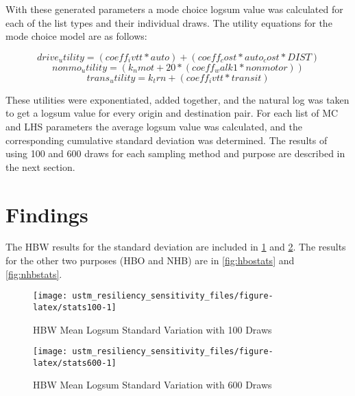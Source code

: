 \documentclass[3p, authoryear, review]{elsarticle} %
\begin{document}
With these generated parameters a mode choice logsum value was calculated for each of the list types and their individual draws. The utility equations for the mode choice model are as follows:

\begin{equation}
{drive_utility} = ({coeff_ivtt}*{auto})+({coeff_cost}*{auto_cost}*{DIST})
\label{eq:driveutil}
\end{equation}
\begin{equation}
{nonmo_utility} = ({k_nmot}+ 20 * ({coeff_walk1}*{nonmotor}))
\label{eq:nonmoutil}
\end{equation}
\begin{equation}
{trans_utility} = {k_trn} + ({coeff_ivtt}*{transit})
\label{eq:transutil}
\end{equation}

These utilities were exponentiated, added together, and the natural log was taken to get a logsum value for every origin and destination pair. For each list of MC and LHS parameters the average logsum value was calculated, and the corresponding cumulative standard deviation was determined. The results of using 100 and 600 draws for each sampling method and purpose are described in the next section.

\hypertarget{findings}{%
\section{Findings}\label{findings}}

The HBW results for the standard deviation are included in \ref{fig:stats100} and \ref{fig:stats600}. The results for the other two purposes (HBO and NHB) are in \ref{fig:hbostats} and \ref{fig:nhbstats}.

\begin{figure}

{\centering \texttt{[image: ustm\_resiliency\_sensitivity\_files/figure-latex/stats100-1]} 

}

\caption{HBW Mean Logsum Standard Variation with 100 Draws}\label{fig:stats100}
\end{figure}

\begin{figure}

{\centering \texttt{[image: ustm\_resiliency\_sensitivity\_files/figure-latex/stats600-1]} 

}

\caption{HBW Mean Logsum Standard Variation with 600 Draws}\label{fig:stats600}
\end{figure}
\end{document}
